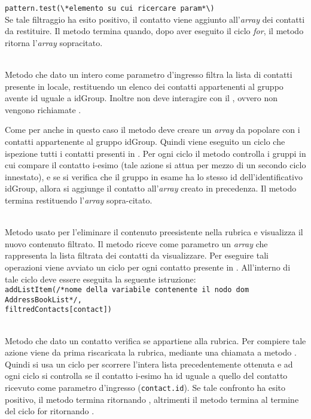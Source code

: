\begin{description}
\verb|pattern.test(\*elemento su cui ricercare param*\)|\\

Se tale filtraggio ha esito positivo, il contatto viene aggiunto all'\textit{array} dei contatti da restituire. Il metodo termina quando, dopo aver eseguito il ciclo \textit{for}, il metodo ritorna l'\textit{array} sopracitato.

\item{}\\
Metodo che dato un intero come parametro d'ingresso filtra la lista di contatti presente in locale, restituendo un elenco dei contatti appartenenti al gruppo avente id uguale a idGroup. Inoltre non deve interagire con il , ovvero non vengono richiamate . 

Come per  anche in questo caso il metodo deve creare un \textit{array} da popolare con i contatti appartenente al gruppo idGroup. Quindi viene eseguito un ciclo  che ispezione tutti i contatti presenti in . Per ogni ciclo il metodo controlla i gruppi in cui compare il contatto i-esimo (tale azione si attua per mezzo di un secondo ciclo innestato), e se si verifica che il gruppo in esame ha lo stesso id dell'identificativo idGroup, allora si aggiunge il contatto all'\textit{array} creato in precedenza. Il metodo termina restituendo l'\textit{array} sopra-citato.

\item{}\\
Metodo usato per l'eliminare il contenuto preesistente nella rubrica e visualizza il nuovo contenuto filtrato. Il metodo riceve come parametro un \textit{array} che rappresenta la lista filtrata dei contatti da visualizzare. Per eseguire tali operazioni viene avviato un ciclo  per ogni contatto presente in . All'interno di tale ciclo deve essere eseguita la seguente istruzione:\\

\verb|addListItem(/*nome della variabile contenente il nodo dom AddressBookList*/,|\\
\verb|filtredContacts[contact])|\\

\item{}\\
Metodo che dato un contatto verifica se appartiene alla rubrica. Per compiere tale azione viene da prima riscaricata la rubrica, mediante una chiamata a metodo . Quindi si usa un ciclo  per scorrere l'intera lista precedentemente ottenuta e ad ogni ciclo si controlla se il contatto i-esimo ha id uguale a quello del contatto ricevuto come parametro d'ingresso (\texttt{contact.id}). Se tale confronto ha esito positivo, il metodo termina ritornando , altrimenti il metodo termina al termine del ciclo for ritornando .


\end{description}
